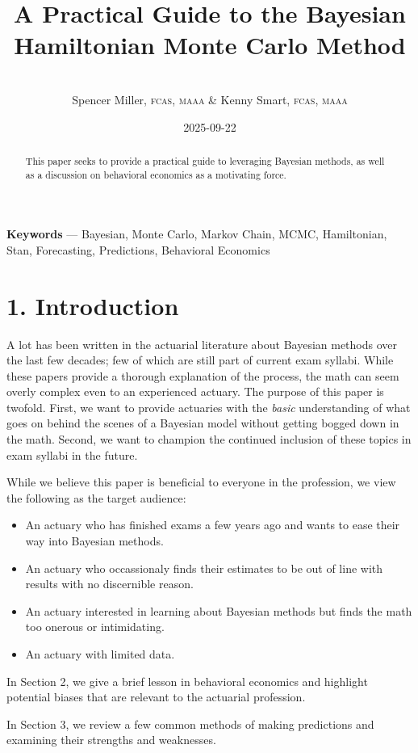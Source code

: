 \documentclass[
]{article}
\title{A Practical Guide to the Bayesian Hamiltonian Monte Carlo Method}
\author{\\
Spencer Miller\textsc{, fcas, maaa} \& Kenny Smart\textsc{, fcas,
maaa}\\}
\date{2025-09-22}
\providecommand{\tightlist}{%
  \setlength{\itemsep}{0pt}\setlength{\parskip}{0pt}}
\begin{document}
\maketitle
\begin{abstract}
This paper seeks to provide a practical guide to leveraging Bayesian
methods, as well as a discussion on behavioral economics as a motivating
force.
\end{abstract}

\textbf{Keywords} --- Bayesian, Monte Carlo, Markov Chain, MCMC,
Hamiltonian, Stan, Forecasting, Predictions, Behavioral Economics

\hypertarget{introduction}{%
\section{1. Introduction}\label{introduction}}

A lot has been written in the actuarial literature about Bayesian
methods over the last few decades; few of which are still part of
current exam syllabi. While these papers provide a thorough explanation
of the process, the math can seem overly complex even to an experienced
actuary. The purpose of this paper is twofold. First, we want to provide
actuaries with the \emph{basic} understanding of what goes on behind the
scenes of a Bayesian model without getting bogged down in the math.
Second, we want to champion the continued inclusion of these topics in
exam syllabi in the future.

While we believe this paper is beneficial to everyone in the profession,
we view the following as the target audience:

\begin{itemize}
\tightlist
\item
  An actuary who has finished exams a few years ago and wants to ease
  their way into Bayesian methods.
\item
  An actuary who occassionaly finds their estimates to be out of line
  with results with no discernible reason.
\item
  An actuary interested in learning about Bayesian methods but finds the
  math too onerous or intimidating.
\item
  An actuary with limited data.
\end{itemize}

In Section 2, we give a brief lesson in behavioral economics and
highlight potential biases that are relevant to the actuarial
profession.

In Section 3, we review a few common methods of making predictions and
examining their strengths and weaknesses.
\end{document}
